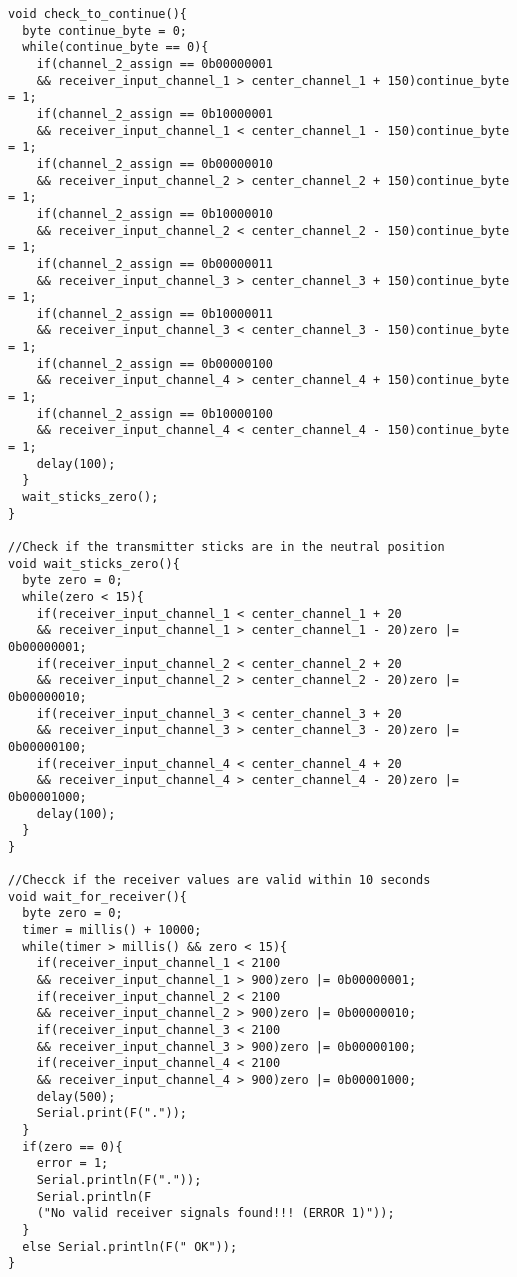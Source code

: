 \begin{lstlisting}
void check_to_continue(){
  byte continue_byte = 0;
  while(continue_byte == 0){
    if(channel_2_assign == 0b00000001 
    && receiver_input_channel_1 > center_channel_1 + 150)continue_byte = 1;
    if(channel_2_assign == 0b10000001 
    && receiver_input_channel_1 < center_channel_1 - 150)continue_byte = 1;
    if(channel_2_assign == 0b00000010 
    && receiver_input_channel_2 > center_channel_2 + 150)continue_byte = 1;
    if(channel_2_assign == 0b10000010 
    && receiver_input_channel_2 < center_channel_2 - 150)continue_byte = 1;
    if(channel_2_assign == 0b00000011 
    && receiver_input_channel_3 > center_channel_3 + 150)continue_byte = 1;
    if(channel_2_assign == 0b10000011 
    && receiver_input_channel_3 < center_channel_3 - 150)continue_byte = 1;
    if(channel_2_assign == 0b00000100 
    && receiver_input_channel_4 > center_channel_4 + 150)continue_byte = 1;
    if(channel_2_assign == 0b10000100 
    && receiver_input_channel_4 < center_channel_4 - 150)continue_byte = 1;
    delay(100);
  }
  wait_sticks_zero();
}

//Check if the transmitter sticks are in the neutral position
void wait_sticks_zero(){
  byte zero = 0;
  while(zero < 15){
    if(receiver_input_channel_1 < center_channel_1 + 20 
    && receiver_input_channel_1 > center_channel_1 - 20)zero |= 0b00000001;
    if(receiver_input_channel_2 < center_channel_2 + 20 
    && receiver_input_channel_2 > center_channel_2 - 20)zero |= 0b00000010;
    if(receiver_input_channel_3 < center_channel_3 + 20 
    && receiver_input_channel_3 > center_channel_3 - 20)zero |= 0b00000100;
    if(receiver_input_channel_4 < center_channel_4 + 20 
    && receiver_input_channel_4 > center_channel_4 - 20)zero |= 0b00001000;
    delay(100);
  }
}

//Checck if the receiver values are valid within 10 seconds
void wait_for_receiver(){
  byte zero = 0;
  timer = millis() + 10000;
  while(timer > millis() && zero < 15){
    if(receiver_input_channel_1 < 2100 
    && receiver_input_channel_1 > 900)zero |= 0b00000001;
    if(receiver_input_channel_2 < 2100 
    && receiver_input_channel_2 > 900)zero |= 0b00000010;
    if(receiver_input_channel_3 < 2100 
    && receiver_input_channel_3 > 900)zero |= 0b00000100;
    if(receiver_input_channel_4 < 2100 
    && receiver_input_channel_4 > 900)zero |= 0b00001000;
    delay(500);
    Serial.print(F("."));
  }
  if(zero == 0){
    error = 1;
    Serial.println(F("."));
    Serial.println(F
    ("No valid receiver signals found!!! (ERROR 1)"));
  }
  else Serial.println(F(" OK"));
}


\end{lstlisting}
